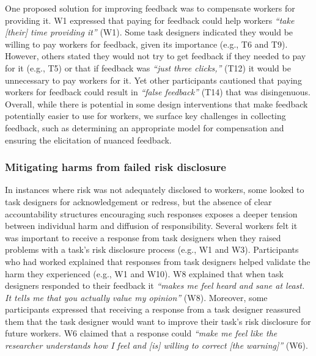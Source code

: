 One proposed solution for improving feedback was to compensate workers for providing it. W1 expressed that paying for feedback could help workers \textit{``take [their] time providing it''} (W1). Some task designers indicated they would be willing to pay workers for feedback, given its importance (e.g., T6 and T9). However, others stated they would not try to get feedback if they needed to pay for it (e.g., T5) or that if feedback was \textit{``just three clicks,''} (T12) it would be unnecessary to pay workers for it. Yet other participants cautioned that paying workers for feedback could result in \textit{``false feedback''} (T14) that was disingenuous. Overall, while there is potential in some design interventions that make feedback potentially easier to use for workers, we surface key challenges in collecting feedback, such as determining an appropriate model for compensation and ensuring the elicitation of nuanced feedback. 


\subsubsection{Mitigating harms from failed risk disclosure}
In instances where risk was not adequately disclosed to workers, some looked to task designers for acknowledgement or redress, but the absence of clear accountability structures encouraging such responses exposes a deeper tension between individual harm and diffusion of responsibility. Several workers felt it was important to receive a response from task designers when they raised problems with a task's  risk disclosure process (e.g., W1 and W3). Participants who had worked explained that responses from task designers helped validate the harm they experienced (e.g., W1 and W10). W8 explained that when task designers responded to their feedback it \textit{``makes me feel heard and sane at least. It tells me that you actually value my opinion''} (W8). Moreover, some participants expressed that receiving a response from a task designer reassured them that the task designer would want to improve their task's risk disclosure for future workers. W6 claimed that a response could \textit{``make me feel like the researcher understands how I feel and [is] willing to correct [the warning]''} (W6). 

